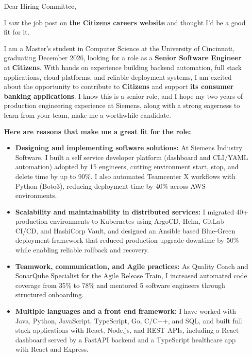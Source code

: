 \documentclass[11pt]{letter}
\date{}
\begin{document}
\begin{letter}{}

\opening{Dear Hiring Committee,}

I saw the job post on \textbf{the Citizens careers website} and thought I'd be a good fit for it.

I am a Master's student in Computer Science at the University of Cincinnati, graduating December 2026, looking for a role as a \textbf{Senior Software Engineer} at \textbf{Citizens}. With hands on experience building backend automation, full stack applications, cloud platforms, and reliable deployment systems, I am excited about the opportunity to contribute to \textbf{Citizens} and support \textbf{its consumer banking applications}. I know this is a senior role, and I hope my two years of production engineering experience at Siemens, along with a strong eagerness to learn from your team, make me a worthwhile candidate.

\textbf{Here are reasons that make me a great fit for the role:}

\begin{itemize}[leftmargin=*, itemsep=0.45em]
    \item \textbf{Designing and implementing software solutions:} At Siemens Industry Software, I built a self service developer platform (dashboard and CLI/YAML automation) adopted by 15 engineers, cutting environment start, stop, and delete time by up to 90\%. I also automated Teamcenter X workflows with Python (Boto3), reducing deployment time by 40\% across AWS environments.

    \item \textbf{Scalability and maintainability in distributed services:} I migrated 40+ production environments to Kubernetes using ArgoCD, Helm, GitLab CI/CD, and HashiCorp Vault, and designed an Ansible based Blue-Green deployment framework that reduced production upgrade downtime by 50\% while enabling reliable rollback and recovery.

    \item \textbf{Teamwork, communication, and Agile practices:} As Quality Coach and SonarQube Specialist for the Agile Release Train, I increased automated code coverage from 35\% to 78\% and mentored 5 software engineers through structured onboarding.

    \item \textbf{Multiple languages and a front end framework:} I have worked with Java, Python, JavaScript, TypeScript, Go, C/C++, and SQL, and built full stack applications with React, Node.js, and REST APIs, including a React dashboard served by a FastAPI backend and a TypeScript healthcare app with React and Express.


\end{itemize}
\end{letter}
\end{document}
